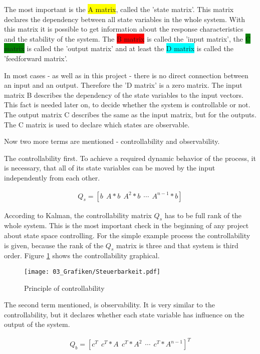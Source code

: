 The most important is the \colorbox{yellow}{A matrix}, called the 'state matrix'. This matrix declares the dependency between all state variables in the whole system. With this matrix it is possible to get information about the response characteristics and the stability of the system. The \colorbox{red}{B matrix} is called the 'input matrix', the \colorbox{green}{C matrix} is called the 'output matrix' and at least the \colorbox{cyan}{D matrix} is called the 'feedforward matrix'. 

In most cases - as well as in this project - there is no direct connection between an input and an output. Therefore the 'D matrix' is a zero matrix. The input matrix B describes the dependency of the state variables to the input vectors. This fact is needed later on, to decide whether the system is controllable or not. The output matrix C describes the same as the input matrix, but for the outputs. The C matrix is used to declare which states are observable.

Now two more terms are mentioned - controllability and observability. 

The controllability first. To achieve a required dynamic behavior of the process, it is necessary, that all of its state variables can be moved by the input independently from each other. 

\begin{align}\label{Q_s}
	Q_s = \left[b\ \  A*b\ \ A^2*b\ \ \cdots\ \ A^{n-1}*b\right]
\end{align}

According to Kalman, the controllability matrix $Q_s$  has to be full rank of the whole system. This is the most important check in the beginning of any project about state space controlling. For the simple example process the controllability is given, because the rank of the $Q_s$ matrix is three and that system is third order. Figure \ref{fig:Steuerbarkeit} shows the controllability graphical.

\begin{figure}
	\centering
		\texttt{[image: 03\_Grafiken/Steuerbarkeit.pdf]}
	\caption{Principle of controllability}
	\label{fig:Steuerbarkeit}
\end{figure}

The second term mentioned, is observability. It is very similar to the controllability, but it declares whether each state variable has influence on the output of the system.

\begin{align}\label{Q_b}
	Q_b = \left[c^T\ \  c^T*A\ \ c^T*A^2\ \ \cdots\ \ c^T*A^{n-1}\right]^T
\end{align}

